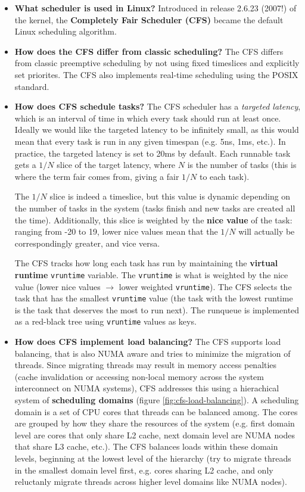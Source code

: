 \documentclass[12pt]{article}
\begin{document}
\begin{itemize}
    \item \textbf{What scheduler is used in Linux?} Introduced in release 2.6.23 (2007!) of the kernel, the \textbf{Completely Fair Scheduler (CFS)} became the default Linux scheduling algorithm.
    \item \textbf{How does the CFS differ from classic scheduling?} The CFS differs from classic preemptive scheduling by not using fixed timeslices and explicitly set priorites. The CFS also implements real-time scheduling using the POSIX standard.
    \item \textbf{How does CFS schedule tasks?} The CFS scheduler has a \textit{targeted latency}, which is an interval of time in which every task should run at least once. Ideally we would like the targeted latency to be infinitely small, as this would mean that every task is run in any given timespan (e.g. 5ns, 1ms, etc.). In practice, the targeted latency is set to 20ms by default. Each runnable task gets a \(1/N\) slice of the target latency, where \(N\) is the number of tasks (this is where the term fair comes from, giving a fair \(1/N\) to each task). \begin{sloppypar} The \(1/N\) slice is indeed a timeslice, but this value is dynamic depending on the number of tasks in the system (tasks finish and new tasks are created all the time). Additionally, this slice is weighted by the \textbf{nice value} of the task: ranging from -20 to 19, lower nice values mean that the \(1/N\) will actually be correspondingly greater, and vice versa. \end{sloppypar} \begin{sloppypar} The CFS tracks how long each task has run by maintaining the \textbf{virtual runtime} \texttt{vruntime} variable. The \texttt{vruntime} is what is weighted by the nice value (lower nice values \(\rightarrow\) lower weighted \texttt{vruntime}). The CFS selects the task that has the smallest \texttt{vruntime} value (the task with the lowest runtime is the task that deserves the most to run next). The runqueue is implemented as a red-black tree using \texttt{vruntime} values as keys. \end{sloppypar} 
    \item \textbf{How does CFS implement load balancing?} The CFS supports load balancing, that is also NUMA aware and tries to minimize the migration of threads. Since migrating threads may result in memory access penalties (cache invalidation or accessing non-local memory across the system interconnect on NUMA systems), CFS addresses this using a hierachical system of \textbf{scheduling domains} (figure \ref{fig:cfs-load-balancing}). A scheduling domain is a set of CPU cores that threads can be balanced among. The cores are grouped by how they share the resources of the system (e.g. first domain level are cores that only share L2 cache, next domain level are NUMA nodes that share L3 cache, etc.). The CFS balances loads within these domain levels, beginning at the lowest level of the hierarchy (try to migrate threads in the smallest domain level first, e.g. cores sharing L2 cache, and only reluctanly migrate threads across higher level domains like NUMA nodes).

\end{itemize}
\end{document}
